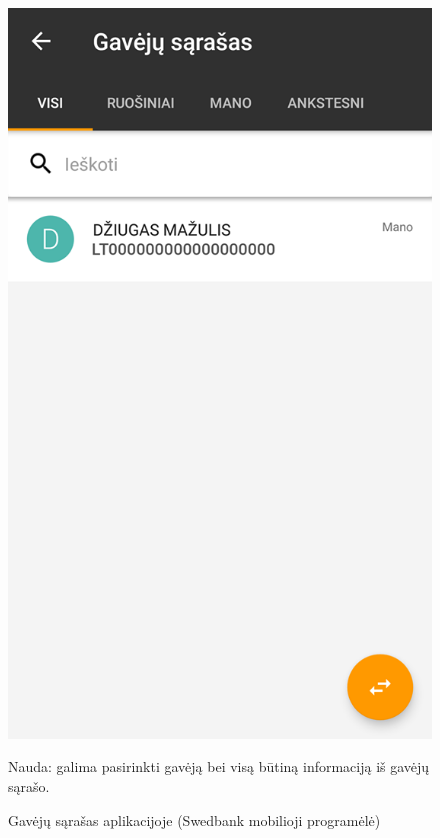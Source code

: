 \documentclass{VUMIFPSkursinis}
\begin{document}
\begin{figure}[!htb]
	\begin{center}
	\includegraphics[scale=0.4]{mobileAppRecipientList.png}
	\end{center}
  \caption{Gavėjų sąrašas aplikacijoje (Swedbank mobilioji programėlė)}
	\label{fig:mobileAppRecipientList}
	Nauda: galima pasirinkti gavėją bei visą būtiną informaciją iš gavėjų sąrašo.
\end{figure}
\end{document}
